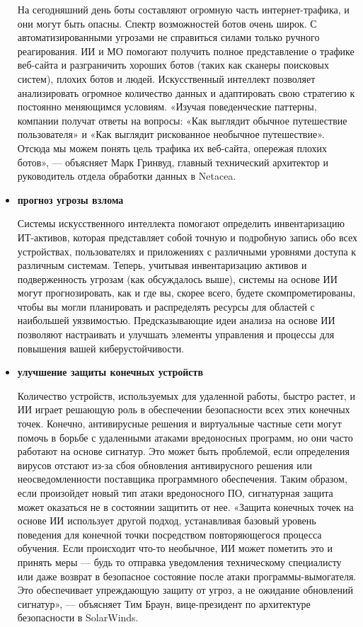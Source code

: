 \documentclass{article}
\begin{document}
\begin{itemize}
На сегодняшний день боты составляют огромную часть интернет-трафика, и они могут быть опасны. Спектр возможностей ботов очень широк.
С автоматизированными угрозами не справиться силами только ручного реагирования. ИИ и МО помогают получить полное представление о трафике веб-сайта и разграничить хороших ботов (таких как сканеры поисковых систем), плохих ботов и людей. Искусственный интеллект позволяет анализировать огромное количество данных и  адаптировать свою стратегию к постоянно меняющимся условиям.
«Изучая поведенческие паттерны, компании получат ответы на вопросы: «Как выглядит обычное путешествие пользователя» и «Как выглядит рискованное необычное путешествие». Отсюда мы можем понять цель трафика их веб-сайта, опережая плохих ботов», — объясняет Марк Гринвуд, главный технический архитектор и руководитель отдела обработки данных в Netacea.
    \item \textbf{прогноз угрозы взлома}
    
Системы искусственного интеллекта помогают определить инвентаризацию ИТ-активов, которая представляет собой точную и подробную запись обо всех устройствах, пользователях и приложениях с различными уровнями доступа к различным системам. Теперь, учитывая инвентаризацию активов и подверженность угрозам (как обсуждалось выше), системы на основе ИИ могут прогнозировать, как и где вы, скорее всего, будете скомпрометированы, чтобы вы могли планировать и распределять ресурсы для областей с наибольшей уязвимостью.
Предсказывающие идеи анализа на основе ИИ позволяют настраивать и улучшать элементы управления и процессы для повышения вашей киберустойчивости.
    \item \textbf{улучшение защиты конечных устройств}
    
Количество устройств, используемых для удаленной работы, быстро растет, и ИИ играет решающую роль в обеспечении безопасности всех этих конечных точек.
Конечно, антивирусные решения и виртуальные частные сети могут помочь в борьбе с удаленными атаками вредоносных программ, но они часто работают на основе сигнатур. Это может быть проблемой, если определения вирусов отстают из-за сбоя обновления антивирусного решения или неосведомленности поставщика программного обеспечения. Таким образом, если произойдет новый тип атаки вредоносного ПО, сигнатурная защита может оказаться не в состоянии защитить от нее.
«Защита конечных точек на основе ИИ использует другой подход, устанавливая базовый уровень поведения для конечной точки посредством повторяющегося процесса обучения. Если происходит что-то необычное, ИИ может пометить это и принять меры — будь то отправка уведомления техническому специалисту или даже возврат в безопасное состояние после атаки программы-вымогателя. Это обеспечивает упреждающую защиту от угроз, а не ожидание обновлений сигнатур», — объясняет Тим ​​Браун, вице-президент по архитектуре безопасности в SolarWinds.
\end{itemize}
\end{document}
